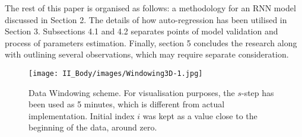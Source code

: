 %
%
The rest of this paper is organised as follows: a methodology for an RNN model discussed in Section 2.
The details of how auto-regression has been utilised in Section 3.
Subsections 4.1 and 4.2 separates points of model validation and process of parameters estimation.
Finally, section 5 concludes the research along with outlining several observations, which may require separate consideration.
\begin{landscape}
    \begin{figure}[ht]
        \centering
        \texttt{[image: II\_Body/images/Windowing3D-1.jpg]}
        \caption{Data Windowing scheme. For visualisation purposes, the $s$-step has been used as 5 minutes, which is different from actual implementation. Initial index $i$ was kept as a value close to the beginning of the data, around zero.}
        \label{fig:Windowing}
    \end{figure}
\end{landscape}